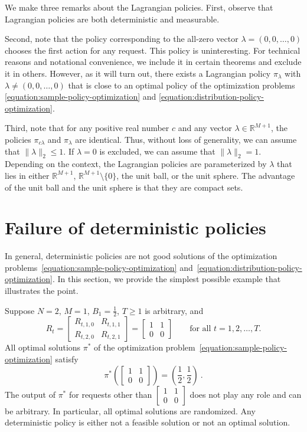 \documentclass[12pt]{article}
\newcommand{\R}{\mathbb{R}}
\theoremstyle{definition}
\begin{document}
We make three remarks about the Lagrangian policies. First, observe that
Lagrangian policies are both deterministic and measurable.

Second, note that the policy corresponding to the all-zero vector $\lambda = (0,
0, \dots, 0)$ chooses the first action for any request. This policy is
uninteresting. For technical reasons and notational convenience, we include it
in certain theorems and exclude it in others. However, as it will turn out,
there exists a Lagrangian policy $\pi_\lambda$ with $\lambda \neq (0, 0, \dots,
0)$ that is close to an optimal policy of the optimization problems
\eqref{equation:sample-policy-optimization} and
\eqref{equation:distribution-policy-optimization}.

Third, note that for any positive real number $c$ and any vector $\lambda \in
\R^{M+1}$, the policies $\pi_{c \lambda}$ and $\pi_\lambda$ are identical. Thus,
without loss of generality, we can assume that $\|\lambda\|_2 \le 1$. If
$\lambda = 0$ is excluded, we can assume that $\|\lambda\|_2 = 1$. Depending on
the context, the Lagrangian policies are parameterized by $\lambda$ that lies in
either $\R^{M+1}$, $\R^{M+1} \setminus \{0\}$, the unit ball, or the unit
sphere. The advantage of the unit ball and the unit sphere is that they are
compact sets.

\section{Failure of deterministic policies}

In general, deterministic policies are not good solutions of the optimization
problems~\eqref{equation:sample-policy-optimization}
and~\eqref{equation:distribution-policy-optimization}. In this section, we
provide the simplest possible example that illustrates the point.

Suppose $N=2$, $M=1$, $B_1 = \frac{1}{2}$, $T \ge 1$ is arbitrary, and
$$
R_t
= \begin{bmatrix} R_{t,1,0} & R_{t,1,1} \\ R_{t,2,0} & R_{t,2,1} \end{bmatrix}
= \begin{bmatrix} 1 & 1 \\ 0 & 0 \end{bmatrix}
\qquad \text{for all $t=1,2,\dots,T$.}
$$
All optimal solutions $\pi^*$ of the optimization
problem~\eqref{equation:sample-policy-optimization} satisfy
\begin{equation}
\label{equation:uniform-random-policy-on-two-outcomes}
\pi^*(\left[\begin{smallmatrix} 1 & 1 \\ 0 & 0 \end{smallmatrix}\right]) = \left( \frac{1}{2}, \frac{1}{2} \right) \: .
\end{equation}
The output of $\pi^*$ for requests other than $\left[\begin{smallmatrix} 1 & 1
\\ 0 & 0 \end{smallmatrix}\right]$ does not play any role and can be
arbitrary. In particular, all optimal solutions are randomized. Any
deterministic policy is either not a feasible solution or not an optimal
solution.
\end{document}

